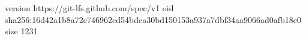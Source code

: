 version https://git-lfs.github.com/spec/v1
oid sha256:16d42a1b8a72e746962cd54bdea30bd150153a937a7dbf34aa9066ad0afb18e0
size 1231
